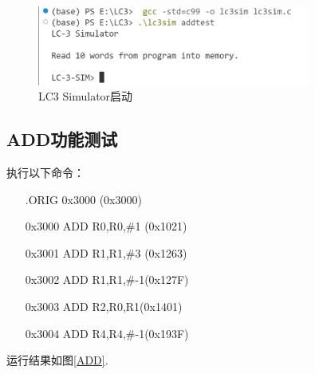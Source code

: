 \documentclass[UTF8]{ctexart}
\begin{document}
\begin{figure}[htbp!]
    \centering
    \includegraphics[width=0.8\textwidth]{launch.png}
    \caption{LC3 Simulator启动}
\end{figure}

\subsection{ADD功能测试}
执行以下命令：
\begin{enumerate}
    \item[ ] .ORIG 0x3000 (0x3000)
    \item[0x3000] ADD R0,R0,\#1 (0x1021)
    \item[0x3001]  ADD R1,R1,\#3 (0x1263)
    \item[0x3002]  ADD R1,R1,\#-1(0x127F)
    \item[0x3003] ADD R2,R0,R1(0x1401)
    \item[0x3004] ADD R4,R4,\#-1(0x193F)
\end{enumerate}

运行结果如图\ref{ADD}.
\end{document}
